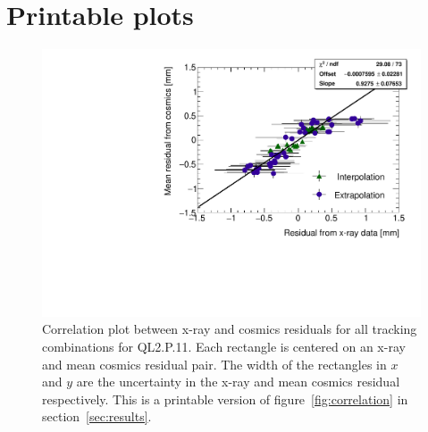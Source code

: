 
\chapter[Printable plots]{Printable plots}
\label{appendix:print}

\begin{figure}
    \centering
    \includegraphics[width = \textwidth]{figures/figure_QL2P11_3100V_2021-08-05_QL2P11_local_cosmic_and_xray_data_correlation_plot_printable.pdf}
    \caption{Correlation plot between x-ray and cosmics residuals for all tracking combinations for QL2.P.11. Each rectangle is centered on an x-ray and mean cosmics residual pair. The width of the rectangles in $x$ and $y$ are the uncertainty in the x-ray and mean cosmics residual respectively. This is a printable version of figure~\ref{fig:correlation} in section~\ref{sec:results}.}
    \label{fig:correlation_print}
\end{figure}

